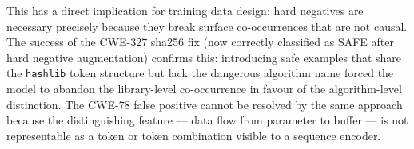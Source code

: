 This has a direct implication for training data design: hard negatives are necessary
precisely because they break surface co-occurrences that are not causal.
The success of the CWE-327 sha256 fix (now correctly classified as SAFE after hard
negative augmentation) confirms this: introducing safe examples that share the
\texttt{hashlib} token structure but lack the dangerous algorithm name forced the model
to abandon the library-level co-occurrence in favour of the algorithm-level distinction.
The CWE-78 false positive cannot be resolved by the same approach because the
distinguishing feature --- data flow from parameter to buffer --- is not representable
as a token or token combination visible to a sequence encoder.
